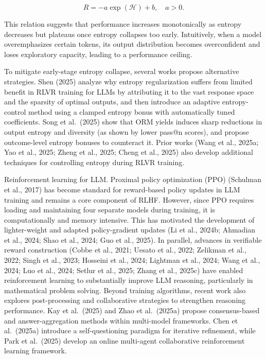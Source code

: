 \documentclass[
  10
]{article}
\begin{document}
\[
R = - a \exp (\mathcal {H}) + b, \quad a > 0.
\]

This relation suggests that performance increases monotonically as
entropy decreases but plateaus once entropy collapses too early.
Intuitively, when a model overemphasizes certain tokens, its output
distribution becomes overconfident and loses exploratory capacity,
leading to a performance ceiling.

To mitigate early-stage entropy collapse, several works propose
alternative strategies. Shen (2025) analyze why entropy regularization
suffers from limited benefit in RLVR training for LLMs by attributing it
to the vast response space and the sparsity of optimal outputs, and then
introduce an adaptive entropy-control method using a clamped entropy
bonus with automatically tuned coefficients. Song et al.~(2025) show
that ORM yields induces sharp reductions in output entropy and diversity
(as shown by lower pass@n scores), and propose outcome-level entropy
bonuses to counteract it. Prior works (Wang et al., 2025a; Yao et al.,
2025; Zheng et al., 2025; Cheng et al., 2025) also develop additional
techniques for controlling entropy during RLVR training.

Reinforcement learning for LLM. Proximal policy optimization (PPO)
(Schulman et al., 2017) has become standard for reward-based policy
updates in LLM training and remains a core component of RLHF. However,
since PPO requires loading and maintaining four separate models during
training, it is computationally and memory intensive. This has motivated
the development of lighter-weight and adapted policy-gradient updates
(Li et al., 2024b; Ahmadian et al., 2024; Shao et al., 2024; Guo et al.,
2025). In parallel, advances in verifiable reward construction (Cobbe et
al., 2021; Uesato et al., 2022; Zelikman et al., 2022; Singh et al.,
2023; Hosseini et al., 2024; Lightman et al., 2024; Wang et al., 2024;
Luo et al., 2024; Setlur et al., 2025; Zhang et al., 2025c) have enabled
reinforcement learning to substantially improve LLM reasoning,
particularly in mathematical problem solving. Beyond training
algorithms, recent work also explores post-processing and collaborative
strategies to strengthen reasoning performance. Kay et al.~(2025) and
Zhao et al.~(2025a) propose consensus-based and answer-aggregation
methods within multi-model frameworks. Chen et al.~(2025a) introduce a
self-questioning paradigm for iterative refinement, while Park et
al.~(2025) develop an online multi-agent collaborative reinforcement
learning framework.
\end{document}
